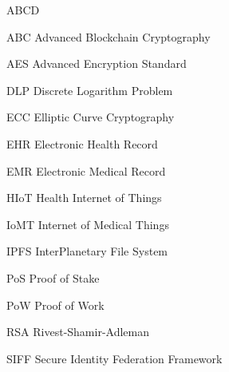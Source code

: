 \begin{listofabbrv}{ABCD} %
    \item[ABC] Advanced Blockchain Cryptography
    \item[AES] Advanced Encryption Standard
    \item[DLP] Discrete Logarithm Problem
    \item[ECC] Elliptic Curve Cryptography
    \item[EHR] Electronic Health Record
    \item[EMR] Electronic Medical Record
    \item[HIoT] Health Internet of Things
    \item[IoMT] Internet of Medical Things
    \item[IPFS] InterPlanetary File System 
    \item[PoS] Proof of Stake
    \item[PoW] Proof of Work
    \item[RSA] Rivest-Shamir-Adleman
    \item[SIFF] Secure Identity Federation Framework
\end{listofabbrv}
